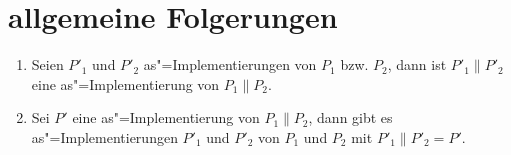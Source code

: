 \chapter{allgemeine Folgerungen}

\begin{Satz}\mbox{}
  \begin{enumerate}
    \item Seien $P'_1$ und $P'_2$ as"=Implementierungen von $P_1$ bzw. $P_2$,
      dann ist $P'_1\|P'_2$ eine as"=Implementierung von $P_1\|P_2$.
    \item Sei $P'$ eine as"=Implementierung von $P_1\|P_2$, dann gibt es
      as"=Implementierungen $P'_1$ und $P'_2$ von $P_1$ und $P_2$ mit
      $P'_1\|P'_2=P'$.
  \end{enumerate}
\end{Satz}

